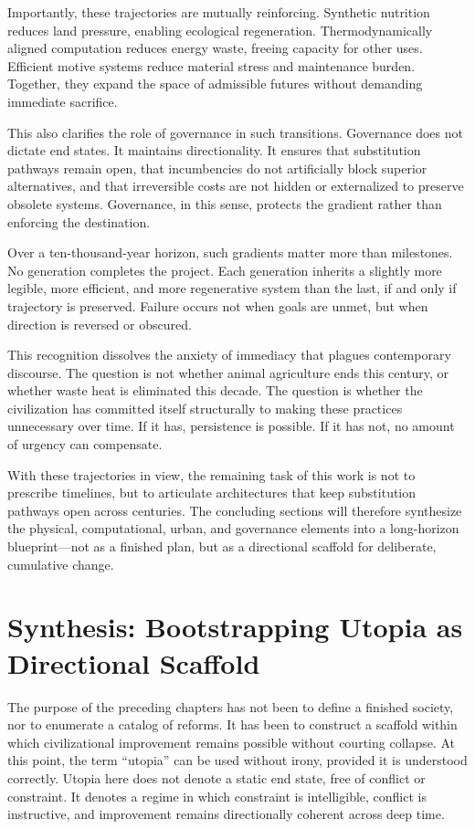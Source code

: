 \documentclass[12pt,oneside]{book}
\begin{document}
Importantly, these trajectories are mutually reinforcing. Synthetic nutrition reduces land pressure, enabling ecological regeneration. Thermodynamically aligned computation reduces energy waste, freeing capacity for other uses. Efficient motive systems reduce material stress and maintenance burden. Together, they expand the space of admissible futures without demanding immediate sacrifice.

This also clarifies the role of governance in such transitions. Governance does not dictate end states. It maintains directionality. It ensures that substitution pathways remain open, that incumbencies do not artificially block superior alternatives, and that irreversible costs are not hidden or externalized to preserve obsolete systems. Governance, in this sense, protects the gradient rather than enforcing the destination.

Over a ten-thousand-year horizon, such gradients matter more than milestones. No generation completes the project. Each generation inherits a slightly more legible, more efficient, and more regenerative system than the last, if and only if trajectory is preserved. Failure occurs not when goals are unmet, but when direction is reversed or obscured.

This recognition dissolves the anxiety of immediacy that plagues contemporary discourse. The question is not whether animal agriculture ends this century, or whether waste heat is eliminated this decade. The question is whether the civilization has committed itself structurally to making these practices unnecessary over time. If it has, persistence is possible. If it has not, no amount of urgency can compensate.

With these trajectories in view, the remaining task of this work is not to prescribe timelines, but to articulate architectures that keep substitution pathways open across centuries. The concluding sections will therefore synthesize the physical, computational, urban, and governance elements into a long-horizon blueprint—not as a finished plan, but as a directional scaffold for deliberate, cumulative change.

\chapter{Synthesis: Bootstrapping Utopia as Directional Scaffold}

The purpose of the preceding chapters has not been to define a finished society, nor to enumerate a catalog of reforms. It has been to construct a scaffold within which civilizational improvement remains possible without courting collapse. At this point, the term “utopia” can be used without irony, provided it is understood correctly. Utopia here does not denote a static end state, free of conflict or constraint. It denotes a regime in which constraint is intelligible, conflict is instructive, and improvement remains directionally coherent across deep time.
\end{document}
